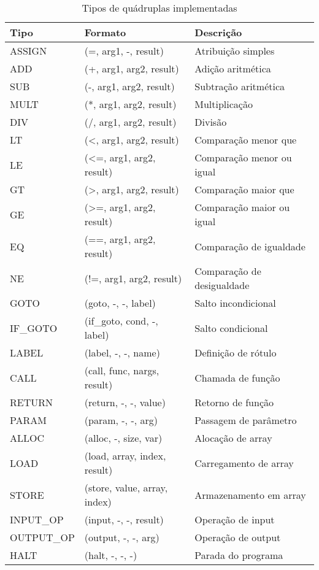 \documentclass[
	12pt,				%
	oneside,
	a4paper,			%
	english,			%
	french,				%
	spanish,			%
	brazil,				%
	]{abntex2}
\begin{document}
\begin{table}[H]
\centering
\caption{Tipos de quádruplas implementadas}
\begin{tabular}{|l|l|l|}
\hline
\textbf{Tipo} & \textbf{Formato} & \textbf{Descrição} \\
\hline
ASSIGN & (=, arg1, -, result) & Atribuição simples \\
\hline
ADD & (+, arg1, arg2, result) & Adição aritmética \\
\hline
SUB & (-, arg1, arg2, result) & Subtração aritmética \\
\hline
MULT & (*, arg1, arg2, result) & Multiplicação \\
\hline
DIV & (/, arg1, arg2, result) & Divisão \\
\hline
LT & (<, arg1, arg2, result) & Comparação menor que \\
\hline
LE & (<=, arg1, arg2, result) & Comparação menor ou igual \\
\hline
GT & (>, arg1, arg2, result) & Comparação maior que \\
\hline
GE & (>=, arg1, arg2, result) & Comparação maior ou igual \\
\hline
EQ & (==, arg1, arg2, result) & Comparação de igualdade \\
\hline
NE & (!=, arg1, arg2, result) & Comparação de desigualdade \\
\hline
GOTO & (goto, -, -, label) & Salto incondicional \\
\hline
IF\_GOTO & (if\_goto, cond, -, label) & Salto condicional \\
\hline
LABEL & (label, -, -, name) & Definição de rótulo \\
\hline
CALL & (call, func, nargs, result) & Chamada de função \\
\hline
RETURN & (return, -, -, value) & Retorno de função \\
\hline
PARAM & (param, -, -, arg) & Passagem de parâmetro \\
\hline
ALLOC & (alloc, -, size, var) & Alocação de array \\
\hline
LOAD & (load, array, index, result) & Carregamento de array \\
\hline
STORE & (store, value, array, index) & Armazenamento em array \\
\hline
INPUT\_OP & (input, -, -, result) & Operação de input \\
\hline
OUTPUT\_OP & (output, -, -, arg) & Operação de output \\
\hline
HALT & (halt, -, -, -) & Parada do programa \\
\hline
\end{tabular}
\end{table}
\end{document}
